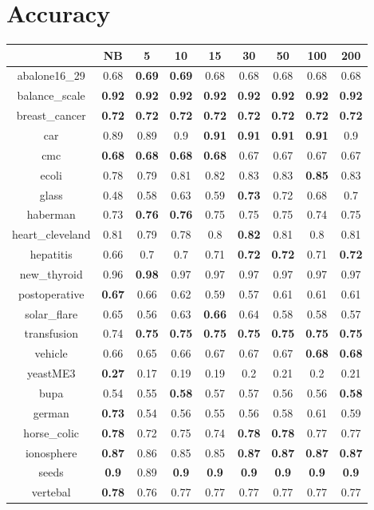 \documentclass{article}%
\begin{document}
%
\normalsize%
\section*{Accuracy}%
\begin{tabular}{c|cccccccc}%
\hline%
&NB&5&10&15&30&50&100&200\\%
\hline%
abalone16\_29&0.68&\textbf{0.69}&\textbf{0.69}&0.68&0.68&0.68&0.68&0.68\\%
\hline%
balance\_scale&\textbf{0.92}&\textbf{0.92}&\textbf{0.92}&\textbf{0.92}&\textbf{0.92}&\textbf{0.92}&\textbf{0.92}&\textbf{0.92}\\%
\hline%
breast\_cancer&\textbf{0.72}&\textbf{0.72}&\textbf{0.72}&\textbf{0.72}&\textbf{0.72}&\textbf{0.72}&\textbf{0.72}&\textbf{0.72}\\%
\hline%
car&0.89&0.89&0.9&\textbf{0.91}&\textbf{0.91}&\textbf{0.91}&\textbf{0.91}&0.9\\%
\hline%
cmc&\textbf{0.68}&\textbf{0.68}&\textbf{0.68}&\textbf{0.68}&0.67&0.67&0.67&0.67\\%
\hline%
ecoli&0.78&0.79&0.81&0.82&0.83&0.83&\textbf{0.85}&0.83\\%
\hline%
glass&0.48&0.58&0.63&0.59&\textbf{0.73}&0.72&0.68&0.7\\%
\hline%
haberman&0.73&\textbf{0.76}&\textbf{0.76}&0.75&0.75&0.75&0.74&0.75\\%
\hline%
heart\_cleveland&0.81&0.79&0.78&0.8&\textbf{0.82}&0.81&0.8&0.81\\%
\hline%
hepatitis&0.66&0.7&0.7&0.71&\textbf{0.72}&\textbf{0.72}&0.71&\textbf{0.72}\\%
\hline%
new\_thyroid&0.96&\textbf{0.98}&0.97&0.97&0.97&0.97&0.97&0.97\\%
\hline%
postoperative&\textbf{0.67}&0.66&0.62&0.59&0.57&0.61&0.61&0.61\\%
\hline%
solar\_flare&0.65&0.56&0.63&\textbf{0.66}&0.64&0.58&0.58&0.57\\%
\hline%
transfusion&0.74&\textbf{0.75}&\textbf{0.75}&\textbf{0.75}&\textbf{0.75}&\textbf{0.75}&\textbf{0.75}&\textbf{0.75}\\%
\hline%
vehicle&0.66&0.65&0.66&0.67&0.67&0.67&\textbf{0.68}&\textbf{0.68}\\%
\hline%
yeastME3&\textbf{0.27}&0.17&0.19&0.19&0.2&0.21&0.2&0.21\\%
\hline%
bupa&0.54&0.55&\textbf{0.58}&0.57&0.57&0.56&0.56&\textbf{0.58}\\%
\hline%
german&\textbf{0.73}&0.54&0.56&0.55&0.56&0.58&0.61&0.59\\%
\hline%
horse\_colic&\textbf{0.78}&0.72&0.75&0.74&\textbf{0.78}&\textbf{0.78}&0.77&0.77\\%
\hline%
ionosphere&\textbf{0.87}&0.86&0.85&0.85&\textbf{0.87}&\textbf{0.87}&\textbf{0.87}&\textbf{0.87}\\%
\hline%
seeds&\textbf{0.9}&0.89&\textbf{0.9}&\textbf{0.9}&\textbf{0.9}&\textbf{0.9}&\textbf{0.9}&\textbf{0.9}\\%
\hline%
vertebal&\textbf{0.78}&0.76&0.77&0.77&0.77&0.77&0.77&0.77\\%
\hline%
\end{tabular}
\end{document}
